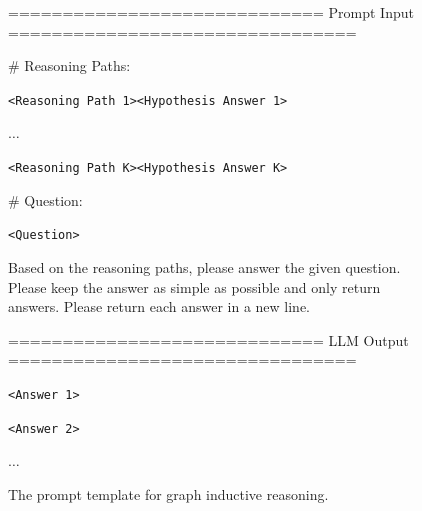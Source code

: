 \begin{figure}[h]
    \centering
    \begin{minipage}{0.99\columnwidth}
        \centering
        \begin{tcolorbox}[title=Graph Inductive Reasoning Prompt]
            \small
            ============================= Prompt Input ================================
    
            \# Reasoning Paths:

            \texttt{<Reasoning Path 1>}\texttt{<Hypothesis Answer 1>}

            $\ldots$

            \texttt{<Reasoning Path K>}\texttt{<Hypothesis Answer K>}
            
            \vspace{10pt}

            \# Question: 
            
            \texttt{<Question>}

            \vspace{10pt}

            Based on the reasoning paths, please answer the given question. Please keep the answer as simple as possible and only return answers. Please return each answer in a new line.
            
            \vspace{10pt}
            ============================= LLM Output ================================
    
            \texttt{<Answer 1>}

            \texttt{<Answer 2>}

            $\ldots$
            
            
        \end{tcolorbox}
        \vspace{1mm}
    \end{minipage}
    \caption{The prompt template for graph inductive reasoning.}
    \label{fig:reasoning_prompt}
\end{figure}
